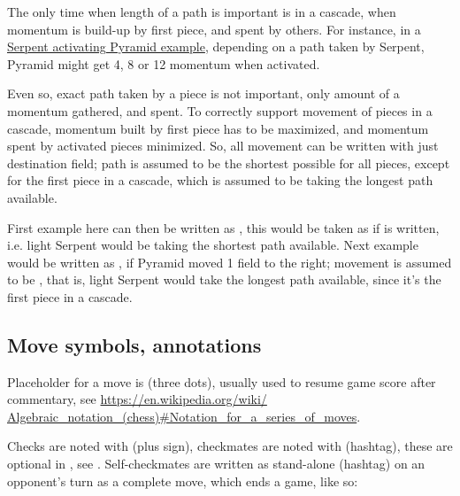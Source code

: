 The only time when length of a path is important is in a cascade, when momentum is build-up
by first piece, and spent by others. For instance, in a
\hyperref[fig:scn_tr_12_serpent_path_short]{Serpent activating Pyramid example}, depending on
a path taken by Serpent, Pyramid might get 4, 8 or 12 momentum when activated.

Even so, exact path taken by a piece is not important, only amount of a momentum gathered,
and spent. To correctly support movement of pieces in a cascade, momentum built by first
piece has to be maximized, and momentum spent by activated pieces minimized. So, all movement
can be written with just destination field; path is assumed to be the shortest possible for
all pieces, except for the first piece in a cascade, which is assumed to be taking the longest
path available.

First example here can then be written as , this would be taken as if
 is written, i.e. light Serpent would be taking the shortest path
available. Next example would be written as , if Pyramid moved 1 field
to the right; movement is assumed to be \newline
\alg{[Sc3.d2.e3.f2.g3.f4.g5.f6.e5.d6.c5.b6.c7]} \newline
\alg{\~{}[Ac7-d7]}, that is, light Serpent would take the longest path available,
since it's the first piece in a cascade.

\subsection*{Move symbols, annotations}
\label{sec:Appendix/Notation/Move symbols, annotations}

Placeholder for a move is  (three dots), usually used to resume game score
after commentary, see \newline
\href{https://en.wikipedia.org/wiki/Algebraic\_notation\_(chess)\#Notation\_for\_a\_series\_of\_moves}
{https://en.wikipedia.org/wiki/\newline
Algebraic\_notation\_(chess)\#Notation\_for\_a\_series\_of\_moves}.

Checks are noted with \alg{+} (plus sign), checkmates are noted with \alg{\#} (hashtag),
these are optional in , see . Self-checkmates are written
as stand-alone \alg{\#} (hashtag) on an opponent's turn as a complete move, which ends
a game, like so:

